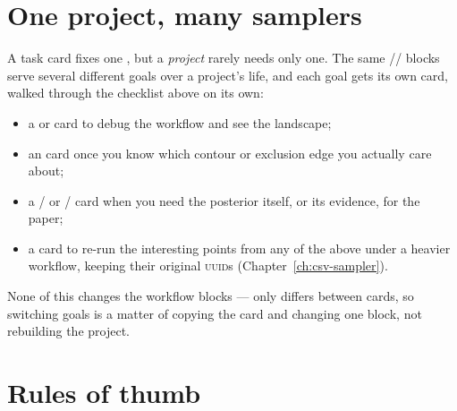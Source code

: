 \section{One project, many samplers}
\label{sec:many-samplers}

A task card fixes one , but a \emph{project} rarely needs only one.
The same // blocks serve
several different goals over a project's life, and each goal gets its own card,
walked through the checklist above on its own:

\begin{itemize}
  \item a  or  card to debug the workflow and see
        the landscape;
  \item an  card once you know which contour or exclusion
        edge you actually care about;
  \item a / or /
        card when you need the posterior itself, or its evidence, for the paper;
  \item a  card to re-run the interesting points from any of the above
        under a heavier workflow, keeping their original \textsc{uuid}s
        (Chapter~\ref{ch:csv-sampler}).
\end{itemize}

None of this changes the workflow blocks --- only  differs between
cards, so switching goals is a matter of copying the card and changing one block, not
rebuilding the project.

\section{Rules of thumb}

